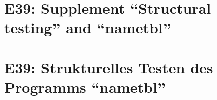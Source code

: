 
\thispagestyle{empty}
\ifenglish
\section*{E39: Supplement ``Structural testing'' and ``nametbl''}

\fi
\ifgerman
\section*{E39: Strukturelles Testen des Programms "`nametbl"'}

\fi

